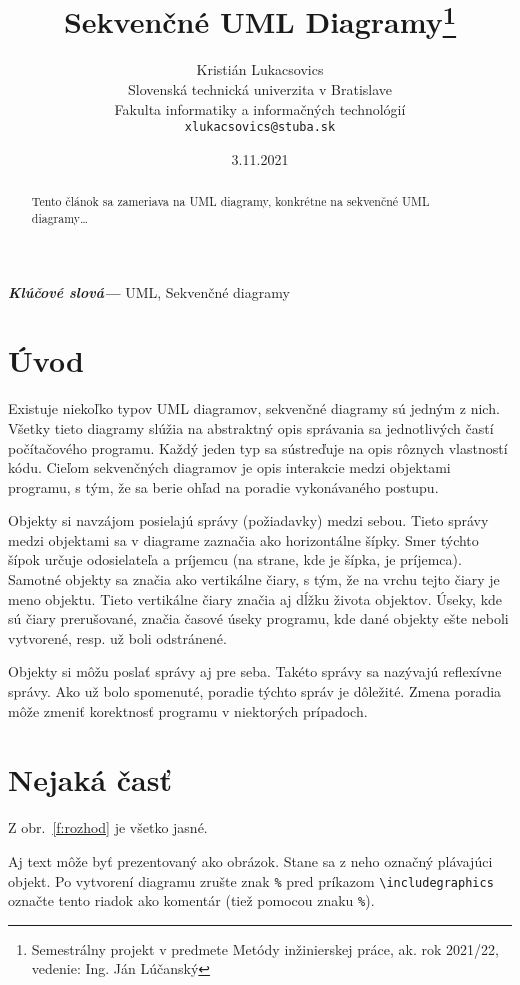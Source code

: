 \documentclass[10pt,twoside,slovak,a4paper]{article}
\title{Sekvenčné UML Diagramy\thanks{Semestrálny projekt v predmete Metódy inžinierskej práce, ak. rok 2021/22, vedenie: Ing. Ján Lúčanský}} %
\author{Kristián Lukacsovics\\[2pt]
    {\small Slovenská technická univerzita v Bratislave}\\
    {\small Fakulta informatiky a informačných technológií}\\
    {\small \texttt{xlukacsovics@stuba.sk}}
    }
\date{\small 3.11.2021} %
\providecommand{\keywords}[1]{\textbf{\textit{Klúčové slová---}} #1}
\begin{document}
\maketitle

\begin{abstract}
Tento článok sa zameriava na UML diagramy, konkrétne na sekvenčné UML diagramy\ldots
\end{abstract}
\keywords{UML, Sekvenčné diagramy}

\section{Úvod}

Existuje niekoľko typov UML diagramov, sekvenčné diagramy sú jedným z nich. Všetky tieto diagramy slúžia na
abstraktný opis správania sa jednotlivých častí počítačového programu. Každý jeden typ sa sústreďuje na opis
rôznych vlastností kódu. Cieľom sekvenčných diagramov je opis interakcie medzi objektami programu, s tým, že sa
berie ohľad na poradie vykonávaného postupu. \newline

\noindent Objekty si navzájom posielajú správy (požiadavky) medzi sebou. Tieto
správy medzi objektami sa v diagrame zaznačia ako horizontálne šípky. Smer týchto šípok určuje odosielateľa a
príjemcu (na strane, kde je šípka, je príjemca). Samotné objekty sa značia ako vertikálne čiary, s tým, že
na vrchu tejto čiary je meno objektu. Tieto vertikálne čiary značia aj dĺžku života objektov. Úseky, kde sú
čiary prerušované, značia časové úseky programu, kde dané objekty ešte neboli vytvorené, resp. už boli odstránené. \newline

\noindent Objekty si môžu poslať správy aj pre seba. Takéto správy sa nazývajú reflexívne správy. 
Ako už bolo spomenuté, poradie týchto správ je dôležité. Zmena poradia môže zmeniť korektnosť programu
v niektorých prípadoch. 



\section{Nejaká časť} \label{nejaka}

Z obr.~\ref{f:rozhod} je všetko jasné. 

\begin{figure*}[tbh]
\centering
Aj text môže byť prezentovaný ako obrázok. Stane sa z neho označný plávajúci objekt. Po vytvorení diagramu zrušte znak \texttt{\%} pred príkazom \verb|\includegraphics| označte tento riadok ako komentár (tiež pomocou znaku \texttt{\%}).
\caption{Rozhodujúci argument.}
\label{f:rozhod}
\end{figure*}
\end{document}
